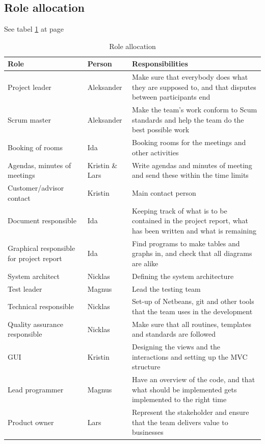 \subsection{Role allocation}
See tabel \ref{tab:roleallocation} at page \pageref{tab:roleallocation}
\begin{table}
\begin{tabularx}{\linewidth}{>{\setlength\hsize{.5\hsize}}X|>{\setlength\hsize{0.3\hsize}}X|>{\setlength\hsize{1\hsize}}X}
\textbf{Role} & \textbf{Person} & \textbf{Responsibilities} \\ \hline \hline
Project leader & Aleksander & Make sure that everybody does what they are supposed to, and that disputes between participants end \\ \hline
Scrum master & Aleksander & Make the team’s work conform to Scum standards and help the team do the best possible work \\ \hline
Booking of rooms & Ida & Booking rooms for the meetings and other activities \\ \hline
Agendas, minutes of meetings & Kristin \& Lars & Write agendas and minutes of meeting and send these within the time limits \\ \hline
Customer/advisor contact & Kristin & Main contact person \\ \hline
Document responsible & Ida & Keeping track of what is to be contained in the project report, what has been written and what is remaining \\ \hline
Graphical responsible for project report & Ida & Find programs to make tables and graphs in, and check that all diagrams are alike \\ \hline
System architect & Nicklas & Defining the system architecture \\ \hline
Test leader & Magnus & Lead the testing team \\ \hline
Technical responsible & Nicklas & Set-up of Netbeans, git and other tools that the team uses in the development \\ \hline
Quality assurance responsible & Nicklas & Make sure that all routines, templates and standards are followed \\ \hline
GUI & Kristin & Designing the views and the interactions and setting up the MVC structure \\ \hline
Lead programmer & Magnus & Have an overview of the code, and that what should be implemented gets implemented to the right time \\ \hline
Product owner & Lars & Represent the stakeholder and ensure that the team delivers value to businesses
\end{tabularx}
\caption {Role allocation} \label{tab:roleallocation}
\end{table}

